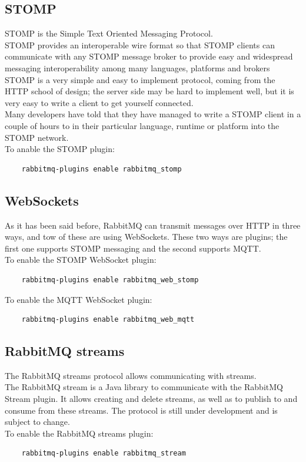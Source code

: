 \documentclass[12pt]{article}
\begin{document}
\subsection*{STOMP}
STOMP is the Simple Text Oriented Messaging Protocol.\\
STOMP provides an interoperable wire format so that STOMP clients can communicate with any STOMP message broker to provide easy and widespread messaging interoperability among many languages, platforms and brokers\\
STOMP is a very simple and easy to implement protocol, coming from the HTTP school of design; the server side may be hard to implement well, but it is very easy to write a client to get yourself connected.\\
Many developers have told that they have managed to write a STOMP client in a couple of hours to in their particular language, runtime or platform into the STOMP network.\\
To anable the STOMP plugin:
\begin{lstlisting}
    rabbitmq-plugins enable rabbitmq_stomp
\end{lstlisting}

\subsection*{WebSockets}
As it has been said before, RabbitMQ can transmit messages over HTTP in three ways, and tow of these are using WebSockets. These two ways are plugins; the first one supports STOMP messaging and the second supports MQTT.\\
To enable the STOMP WebSocket plugin:
\begin{lstlisting}
    rabbitmq-plugins enable rabbitmq_web_stomp
\end{lstlisting}
To enable the MQTT WebSocket plugin:
\begin{lstlisting}
    rabbitmq-plugins enable rabbitmq_web_mqtt
\end{lstlisting}

\subsection*{RabbitMQ streams}
The RabbitMQ streams protocol allows communicating with streams.\\
The RabbitMQ stream is a Java library to communicate with the RabbitMQ Stream plugin. It allows creating and delete streams, as well as to publish to and consume from these streams. The protocol is still under development and is subject to change.\\
To enable the RabbitMQ streams plugin:
\begin{lstlisting}
    rabbitmq-plugins enable rabbitmq_stream
\end{lstlisting}
\end{document}
